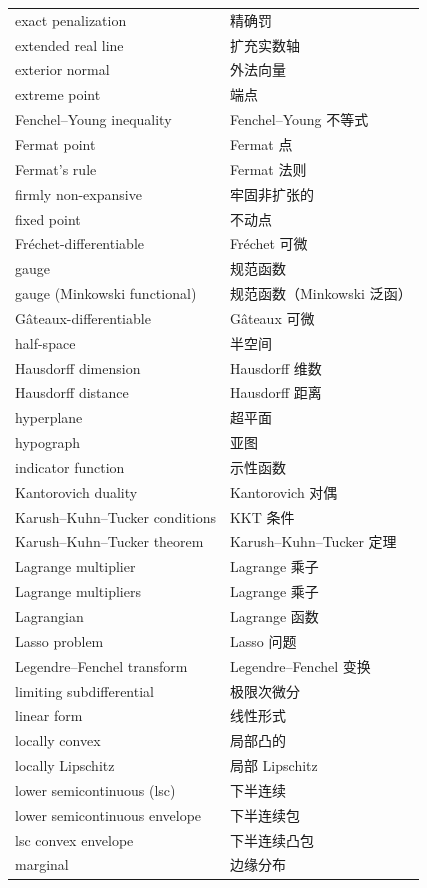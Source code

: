 \begin{longtable}{ll}
exact penalization & 精确罚 \\
extended real line & 扩充实数轴 \\
exterior normal & 外法向量 \\
extreme point & 端点 \\
Fenchel--Young inequality & Fenchel--Young 不等式 \\
Fermat point & Fermat 点 \\
Fermat's rule & Fermat 法则 \\
firmly non-expansive & 牢固非扩张的 \\
fixed point & 不动点 \\
Fréchet-differentiable & Fréchet 可微 \\
gauge & 规范函数 \\
gauge (Minkowski functional) & 规范函数（Minkowski 泛函） \\
Gâteaux-differentiable & Gâteaux 可微 \\
half-space & 半空间 \\
Hausdorff dimension & Hausdorff 维数 \\
Hausdorff distance & Hausdorff 距离 \\
hyperplane & 超平面 \\
hypograph & 亚图 \\
indicator function & 示性函数 \\
Kantorovich duality & Kantorovich 对偶 \\
Karush--Kuhn--Tucker conditions & KKT 条件 \\
Karush--Kuhn--Tucker theorem & Karush--Kuhn--Tucker 定理 \\
Lagrange multiplier & Lagrange 乘子 \\
Lagrange multipliers & Lagrange 乘子 \\
Lagrangian & Lagrange 函数 \\
Lasso problem & Lasso 问题 \\
Legendre--Fenchel transform & Legendre--Fenchel 变换 \\
limiting subdifferential & 极限次微分 \\
linear form & 线性形式 \\
locally convex & 局部凸的 \\
locally Lipschitz & 局部 Lipschitz \\
lower semicontinuous (lsc) & 下半连续 \\
lower semicontinuous envelope & 下半连续包 \\
lsc convex envelope & 下半连续凸包 \\
marginal & 边缘分布 \\

\end{longtable}
